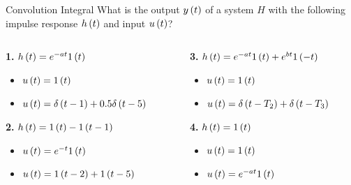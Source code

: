 \documentclass[aspectratio=169]{beamer}
\def\lp{\ensuremath\left(}
\def\rp{\ensuremath\right)}
\begin{document}
\begin{frame}{Convolution Integral}
What is the output $y\lp t\rp$ of a system $H$ with the following impulse response $h\lp t\rp$ and input $u\lp t\rp$?
\vspace{0.3cm}
\begin{columns}
\begin{column}{0.45\textwidth}
\textbf{1. }$h\lp t\rp = e^{-at}1\lp t\rp$
\begin{itemize}
    \item $u\lp t\rp = 1\lp t\rp$
    \item $u\lp t\rp = \delta\lp t - 1\rp + 0.5 \delta\lp t - 5\rp$
\end{itemize}
\vspace{0.3cm}
\textbf{2. }$h\lp t\rp = 1\lp t\rp - 1\lp t - 1\rp$
\begin{itemize}
    \item $u\lp t\rp = e^{-t}1\lp t\rp$
    \item $u\lp t\rp = 1\lp t - 2\rp + 1\lp t - 5\rp$
\end{itemize}
\end{column}

\begin{column}{0.5\textwidth}
\textbf{3. }$h\lp t\rp = e^{-at}1\lp t\rp + e^{bt}1\lp -t\rp$
\begin{itemize}
    \item $u\lp t\rp = 1\lp t\rp$
    \item $u\lp t\rp = \delta\lp t - T_2\rp + \delta\lp t - T_3\rp$
\end{itemize}
\vspace{0.3cm}
\textbf{4. }$h\lp t\rp = 1\lp t\rp$
\begin{itemize}
    \item $u\lp t\rp = 1\lp t\rp$
    \item $u\lp t\rp = e^{-at}1\lp t\rp$
\end{itemize}
\end{column}
\end{columns}
\end{frame}

\begin{frame}[t]
\end{frame}
\end{document}
